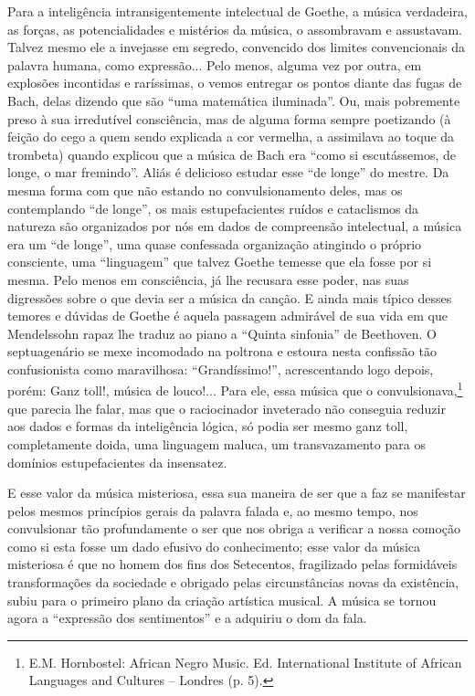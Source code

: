 Para a inteligência intransigentemente intelectual de Goethe, a música
verdadeira, as forças, as potencialidades e mistérios da música, o
assombravam e assustavam. Talvez mesmo ele a invejasse em segredo,
convencido dos limites convencionais da palavra humana, como
expressão... Pelo menos, alguma vez por outra, em explosões incontidas e
raríssimas, o vemos entregar os pontos diante das fugas de Bach, delas
dizendo que são ``uma matemática iluminada''. Ou, mais pobremente preso
à sua irredutível consciência, mas de alguma forma sempre poetizando (à
feição do cego a quem sendo explicada a cor vermelha, a assimilava ao
toque da trombeta) quando explicou que a música de Bach era ``como si
escutássemos, de longe, o mar fremindo''. Aliás é delicioso estudar esse
``de longe'' do mestre. Da mesma forma com que não estando no
convulsionamento deles, mas os contemplando ``de longe'', os mais
estupefacientes ruídos e cataclismos da natureza são organizados por nós
em dados de compreensão intelectual, a música era um ``de longe'', uma
quase confessada organização atingindo o próprio consciente, uma
``linguagem'' que talvez Goethe temesse que ela fosse por si mesma. Pelo
menos em consciência, já lhe recusara esse poder, nas suas digressões
sobre o que devia ser a música da canção. E ainda mais típico desses
temores e dúvidas de Goethe é aquela passagem admirável de sua vida em
que Mendelssohn rapaz lhe traduz ao piano a ``Quinta sinfonia'' de
Beethoven. O septuagenário se mexe incomodado na poltrona e estoura
nesta confissão tão confusionista como maravilhosa: ``Grandíssimo!'',
acrescentando logo depois, porém: Ganz toll!, música de louco!... Para
ele, essa música que o convulsionava,\footnote{E.M. Hornbostel: African Negro Music. Ed. International Institute of
African Languages and Cultures -- Londres (p. 5).} que parecia lhe falar, mas que
o raciocinador inveterado não conseguia reduzir aos dados e formas da
inteligência lógica, só podia ser mesmo ganz toll, completamente doida,
uma linguagem maluca, um transvazamento para os domínios estupefacientes
da insensatez.

E esse valor da música misteriosa, essa sua maneira de ser que a faz se
manifestar pelos mesmos princípios gerais da palavra falada e, ao mesmo
tempo, nos convulsionar tão profundamente o ser que nos obriga a
verificar a nossa comoção como si esta fosse um dado efusivo do
conhecimento; esse valor da música misteriosa é que no homem dos fins
dos Setecentos, fragilizado pelas formidáveis transformações da
sociedade e obrigado pelas circunstâncias novas da existência, subiu
para o primeiro plano da criação artística musical. A música se tornou
agora a ``expressão dos sentimentos'' e a adquiriu o dom da fala.

